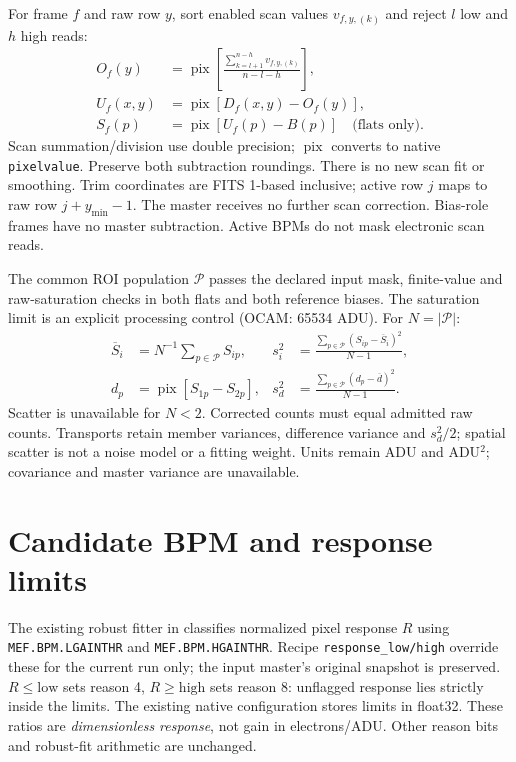 \documentclass[10pt,a4paper]{article}
\begin{document}
For frame $f$ and raw row $y$, sort enabled scan values $v_{f,y,(k)}$ and reject
$l$ low and $h$ high reads:
\begin{align}
O_f(y)&=\operatorname{pix}\left[\frac{\sum_{k=l+1}^{n-h}v_{f,y,(k)}}{n-l-h}\right],\\
U_f(x,y)&=\operatorname{pix}[D_f(x,y)-O_f(y)],\\
S_f(p)&=\operatorname{pix}[U_f(p)-B(p)]\quad\text{(flats only)}.
\end{align}
Scan summation/division use double precision; $\operatorname{pix}$ converts to
native \texttt{pixelvalue}. Preserve both subtraction roundings. There is no
new scan fit or smoothing. Trim coordinates are FITS 1-based inclusive; active
row $j$ maps to raw row $j+y_{\min}-1$. The master receives no further scan
correction. Bias-role frames have no master subtraction. Active BPMs do not
mask electronic scan reads.

The common ROI population $\mathcal P$ passes the declared input mask,
finite-value and raw-saturation checks in both flats and both reference biases.
The saturation limit is an explicit processing control (OCAM: 65534 ADU).
For $N=|\mathcal P|$:
\begin{align}
\overline S_i&=N^{-1}\sum_{p\in\mathcal P}S_{ip}, &
s_i^2&=\frac{\sum_{p\in\mathcal P}(S_{ip}-\overline S_i)^2}{N-1},\\
d_p&=\operatorname{pix}[S_{1p}-S_{2p}], &
s_d^2&=\frac{\sum_{p\in\mathcal P}(d_p-\overline d)^2}{N-1}.
\end{align}
Scatter is unavailable for $N<2$. Corrected counts must equal admitted raw
counts. Transports retain member variances, difference variance and $s_d^2/2$;
spatial scatter is not a noise model or a fitting weight. Units remain ADU
and ADU$^2$; covariance and master variance are unavailable.

\section*{Candidate BPM and response limits}
The existing robust fitter in 
classifies normalized pixel response $R$ using \texttt{MEF.BPM.LGAINTHR} and
\texttt{MEF.BPM.HGAINTHR}. Recipe \texttt{response\_low/high} override these
for the current run only; the input master's original snapshot is preserved.
$R\leq\mathrm{low}$ sets reason 4, $R\geq\mathrm{high}$ sets reason 8:
unflagged response lies strictly inside the limits. The existing native configuration stores limits in float32. These ratios are
\emph{dimensionless response}, not gain in electrons/ADU. Other reason bits
and robust-fit arithmetic are unchanged.
\end{document}
